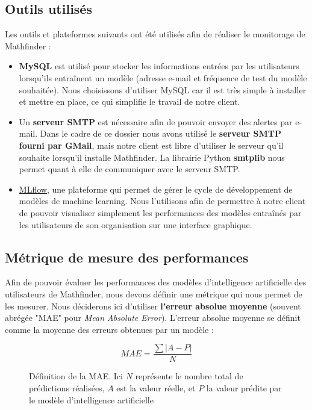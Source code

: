 \documentclass[french]{article}
\begin{document}
    \subsection{Outils utilisés}
    Les outils et plateformes suivants ont été utilisés afin de réaliser le monitorage de Mathfinder :
    \begin{itemize}
        \item \textbf{MySQL} est utilisé pour stocker les informations entrées par les utilisateurs lorsqu'ils entraînent un modèle (adresse e-mail et fréquence de test du modèle souhaitée). Nous choisissons d'utiliser MySQL car il est très simple à installer et mettre en place, ce qui simplifie le travail de notre client.
        \item Un \textbf{serveur SMTP} est nécessaire afin de pouvoir envoyer des alertes par e-mail. Dans le cadre de ce dossier nous avons utilisé le \textbf{serveur SMTP fourni par GMail}, mais notre client est libre d'utiliser le serveur qu'il souhaite lorsqu'il installe Mathfinder. La librairie Python \textbf{smtplib} nous permet quant à elle de communiquer avec le serveur SMTP.
        \item \href{https://mlflow.org/}{MLflow}, une plateforme qui permet de gérer le cycle de développement de modèles de machine learning. Nous l'utilisons afin de permettre à notre client de pouvoir visualiser simplement les performances des modèles entraînés par les utilisateurs de son organisation sur une interface graphique.
        
    \end{itemize}
    \subsection{Métrique de mesure des performances}
    \label{sec:metrics}
    Afin de pouvoir évaluer les performances des modèles d'intelligence artificielle des utilisateurs de Mathfinder, nous devons définir une métrique qui nous permet de les mesurer. Nous déciderons ici d'utiliser \textbf{l'erreur absolue moyenne} (souvent abrégée "MAE" pour \textit{Mean Absolute Error}). L'erreur absolue moyenne se définit comme la moyenne des erreurs obtenues par un modèle :

    \begin{figure}[h!]
        \begin{equation}MAE = \frac{\sum \lvert A-P \rvert}{N}  \end{equation}
        \centering
        \caption{Définition de la MAE. Ici $N$ représente le nombre total de prédictions réalisées, $A$ est la valeur réelle, et $P$ la valeur prédite par le modèle d'intelligence artificielle}
        \centering
    \end{figure}
\end{document}
